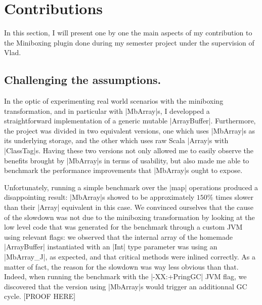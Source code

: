 \section{Contributions}
\label{sec:contrib}

In this section, I will present one by one the main aspects of my contribution to the Miniboxing plugin done during my semester project under the supervision of Vlad.
\subsection{Challenging the assumptions.} 

In the optic of experimenting real world scenarios with the miniboxing transformation, and in particular with |MbArray|s, I developped a straightforward implementation of a generic mutable |ArrayBuffer|. Furthermore, the project was divided in two equivalent versions, one which uses |MbArray|s as its underlying storage, and the other which uses raw Scala |Array|s with |ClassTag|s. Having these two versions not only allowed me to easily observe the benefits brought by |MbArray|s in terms of usability, but also made me able to benchmark the performance improvements that |MbArray|s ought to expose.


Unfortunately, running a simple benchmark over the |map| operations produced a disappointing result: |MbArray|s showed to be approximately $150\%$ times slower than their |Array| equivalent in this case. We convinced ourselves that the cause of the slowdown was not due to the miniboxing transformation by looking at the low level code that was generated for the benchmark through a custom JVM using relevant flags: we observed that the internal array of the homemade |ArrayBuffer| instantiated with an |Int| type parameter was using an |MbArray_J|, as expected, and that critical methods were inlined correctly. As a matter of fact, the reason for the slowdown was way less obvious than that. Indeed, when running the benchmark with the |-XX:+PringGC| JVM flag, we discovered that the version using |MbArray|s would trigger an additionnal GC cycle. [PROOF HERE]


